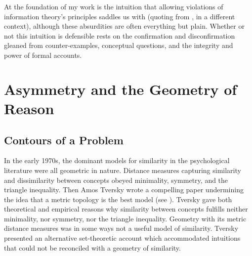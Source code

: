 \documentclass[phd,12pt,oneside]{ubcthesis}
\begin{document}


At the foundation of my work is the intuition that allowing violations
of information theory's principles saddles us with  (quoting from , in
a different context), although these absurdities are often everything
but plain. Whether or not this intuition is defensible rests on the
confirmation and disconfirmation gleaned from counter-examples,
conceptual questions, and the integrity and power of formal accounts.

\chapter{Asymmetry and the Geometry of Reason}
\label{chp:gahrihoo}

\section{Contours of a Problem}
\label{sec:teiyaefi}

In the early 1970s, the dominant models for similarity in the
psychological literature were all geometric in nature. Distance
measures capturing similarity and dissimilarity between concepts
obeyed minimality, symmetry, and the triangle inequality. Then Amos
Tversky wrote a compelling paper undermining the idea that a metric
topology is the best model (see ). Tversky gave
both theoretical and empirical reasons why similarity between concepts
fulfills neither minimality, nor symmetry, nor the triangle inequality.
Geometry with its metric distance measures was in some ways not a
useful model of similarity. Tversky presented an alternative
set-theoretic account which accommodated intuitions that could not be
reconciled with a geometry of similarity.
\end{document}
